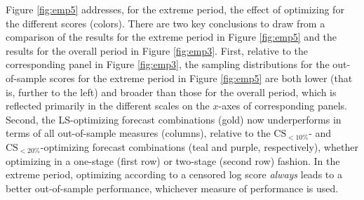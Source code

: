 \documentclass[12pt]{article}
\theoremstyle{definition}
\theoremstyle{remark}
\begin{document}
Figure \ref{fig:emp5} addresses, for the extreme period, the effect of optimizing for the different scores (colors). There are two key conclusions to draw from a comparison of the results for the extreme period in Figure \ref{fig:emp5} and the results for the overall period in Figure \ref{fig:emp3}. First, relative to the corresponding panel in Figure \ref{fig:emp3}, the sampling distributions for the out-of-sample scores for the extreme period in Figure \ref{fig:emp5} are both lower (that is, further to the left) and broader than those for the overall period, which is reflected primarily in the different scales on the $x$-axes of corresponding panels. Second, the LS-optimizing forecast combinations (gold) now underperforms in terms of all out-of-sample measures (columns), relative to the $\mathrm{CS}_{<10\%}$- and $\mathrm{CS}_{<20\%}$-optimizing forecast combinations (teal and purple, respectively), whether optimizing in a one-stage (first row) or two-stage (second row) fashion. In the extreme period, optimizing according to a censored log score \textit{always} leads to a better out-of-sample performance, whichever measure of performance is used.

{
\footnotesize
{}
}
\end{document}
